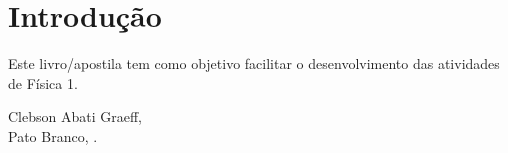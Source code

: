 \chapter*{Introdução}

Este livro/apostila tem como objetivo facilitar o desenvolvimento das atividades de Física 1.

\vspace{1cm}
\begin{flushright}
Clebson Abati Graeff,\\
Pato Branco, \monthyear.
\end{flushright}

